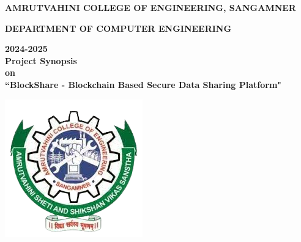 \documentclass[12pt]{report}	%
\begin{document}




 \begin{center}
{\large \bf{  AMRUTVAHINI COLLEGE OF ENGINEERING, SANGAMNER}}\\ 
		\begin{small}
		{ \bf DEPARTMENT OF COMPUTER ENGINEERING}\\ 
		\end{small}
		\small{\bf{2024-2025}}\\
        {\large \bf {Project Synopsis  }} \\
        {\large \bf {on  }} \\
        
\large {\bf ``BlockShare - Blockchain Based Secure Data Sharing Platform"}
       \end{center}
       \begin{center}
\includegraphics[scale=0.5]{AVCOE_LOGO.png} 
\end{center}
\end{document}
